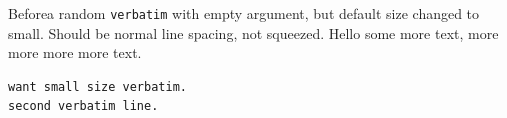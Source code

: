 \documentclass{ltugboat}
\begin{document}
Beforea random \texttt{verbatim} with empty argument,
but default size changed to small.
Should be normal line spacing, not squeezed. Hello some more text, more
more more more text.
\begin{verbatim}
want small size verbatim.
second verbatim line.
\end{verbatim}
\end{document}
